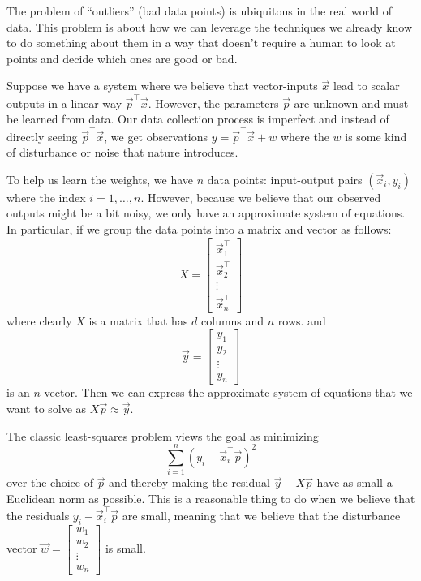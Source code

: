 
The problem of ``outliers'' (bad data points) is ubiquitous in the
real world of data. This problem is about how we can leverage the
techniques we already know to do something about them in a way that
doesn't require a human to look at points and decide which ones are
good or bad. 

Suppose we have a system where we believe that vector-inputs $\vec{x}$ lead
to scalar outputs in a linear way $\vec{p}^\top \vec{x}$. However, the
parameters $\vec{p}$ are unknown and must be learned from data. Our
data collection process is imperfect and instead of directly seeing 
$\vec{p}^\top \vec{x}$, we get observations $y = \vec{p}^\top \vec{x} + w$
where the $w$ is some kind of disturbance or noise that nature introduces.

To help us learn the weights, we have $n$ data points: input-output
pairs $(\vec{x}_i, y_i)$ where the index $i = 1, \ldots, n$. However,
because we believe that our observed outputs might be a bit noisy, we
only have an approximate system of equations. In particular, if we
group the data points into a matrix and vector as follows: 
$$
X = \begin{bmatrix} \vec{x}_1^\top \\ \vec{x}_2^\top \\ \vdots \\
  \vec{x}_n^\top 
\end{bmatrix}
$$ 
where clearly $X$ is a matrix that has $d$ columns and $n$ rows. and 
$$
\vec{y} = \begin{bmatrix} y_1 \\ y_2 \\ \vdots \\  y_n 
\end{bmatrix}
$$ 
is an $n$-vector. Then we can express the approximate system of equations that we want
to solve as $X \vec{p} \approx \vec{y}$. 

The classic least-squares problem views the goal as minimizing 
\begin{equation} \label{eq:outlier-sum}
  \sum_{i=1}^n (y_i - \vec{x}_i^\top \vec{p})^2
\end{equation}
over the choice of $\vec{p}$ and thereby making the residual $\vec{y}
- X \vec{p}$ have as small a Euclidean norm as possible.  This is a
reasonable thing to do when we believe that the residuals $y_i -
\vec{x}_i^\top \vec{p}$ are small, meaning that we believe that the
disturbance vector $\vec{w} = \begin{bmatrix} w_1 \\ w_2 \\ \vdots \\
  w_n
\end{bmatrix}$ is small. 


